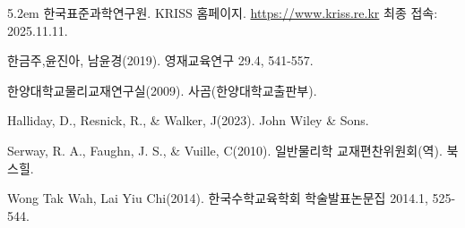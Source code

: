 \begin{hangblock}{5.2em}
한국표준과학연구원.
KRISS 홈페이지. \url{https://www.kriss.re.kr} 최종 접속: 2025.11.11.

한금주,윤진아, 남윤경(2019).
영재교육연구 29.4, 541-557.


한양대학교물리교재연구실(2009).
사곰(한양대학교출판부).

Halliday, D., Resnick, R., \& Walker, J(2023).
John Wiley \& Sons.

Serway, R. A., Faughn, J. S., \& Vuille, C(2010).
일반물리학 교재편찬위원회(역). 북스힐.

Wong Tak Wah, Lai Yiu Chi(2014).
한국수학교육학회 학술발표논문집 2014.1, 525-544.



\end{hangblock}